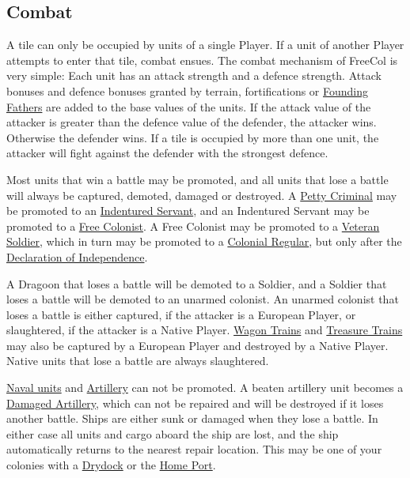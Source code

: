 \documentclass[12pt]{article}
\begin{document}
\hypertarget{Combat}{\subsection{Combat}}

A tile can only be occupied by units of a single Player. If a unit of
another Player attempts to enter that tile, combat ensues. The combat
mechanism of FreeCol is very simple: Each unit has an attack strength
and a defence strength. Attack bonuses and defence bonuses granted by
terrain, fortifications or \hyperlink{Founding Fathers}{Founding
Fathers} are added to the base values of the units. If the attack
value of the attacker is greater than the defence value of the
defender, the attacker wins. Otherwise the defender wins. If a tile is
occupied by more than one unit, the attacker will fight against the
defender with the strongest defence.

Most units that win a battle may be \hypertarget{promotion}{promoted},
and all units that lose a battle will always be captured, demoted,
damaged or destroyed. A \hyperlink{Petty Criminal}{Petty Criminal} may
be promoted to an \hyperlink{Indentured Servant}{Indentured Servant},
and an Indentured Servant may be promoted to a \hyperlink{Free
  Colonist}{Free Colonist}. A Free Colonist may be promoted to a
\hyperlink{Veteran Soldier}{Veteran Soldier}, which in turn may be
promoted to a \hyperlink{Colonial Regular}{Colonial Regular}, but only
after the \hyperlink{Declaration of Independence}{Declaration of
  Independence}.

A Dragoon that loses a battle will be demoted to a Soldier, and a
Soldier that loses a battle will be demoted to an unarmed colonist. An
unarmed colonist that loses a battle is either captured, if the
attacker is a European Player, or slaughtered, if the attacker is a
Native Player. \hyperlink{Wagon Train}{Wagon Trains} and
\hyperlink{Treasure Train}{Treasure Trains} may also be captured by a
European Player and destroyed by a Native Player. Native units that
lose a battle are always slaughtered.

\hyperlink{Naval Units}{Naval units} and
\hyperlink{Artillery}{Artillery} can not be promoted. A beaten
artillery unit becomes a \hyperlink{Damaged Artillery}{Damaged
Artillery}, which can not be repaired and will be destroyed if it
loses another battle. Ships are either sunk or damaged when they lose
a battle. In either case all units and cargo aboard the ship are lost,
and the ship automatically returns to the nearest repair
location. This may be one of your colonies with a
\hyperlink{Drydock}{Drydock} or the \hyperlink{Home Port}{Home Port}.
\end{document}
